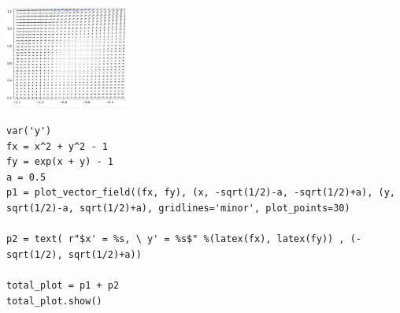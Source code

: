 \documentclass[12pt]{article}					%
\begin{document}
\begin{priklad}
\begin{reseni}
		\begin{center}
			\includegraphics[width=0.3\textwidth]{DU4_2.png}
		\end{center}
		\vspace{-5em}

{\tiny
\begin{verbatim}
var('y')
fx = x^2 + y^2 - 1
fy = exp(x + y) - 1
a = 0.5
p1 = plot_vector_field((fx, fy), (x, -sqrt(1/2)-a, -sqrt(1/2)+a), (y, sqrt(1/2)-a, sqrt(1/2)+a), gridlines='minor', plot_points=30)

p2 = text( r"$x' = %s, \ y' = %s$" %(latex(fx), latex(fy)) , (-sqrt(1/2), sqrt(1/2)+a))

total_plot = p1 + p2
total_plot.show()
\end{verbatim}
}
	\end{reseni}
\end{priklad}
\end{document}
